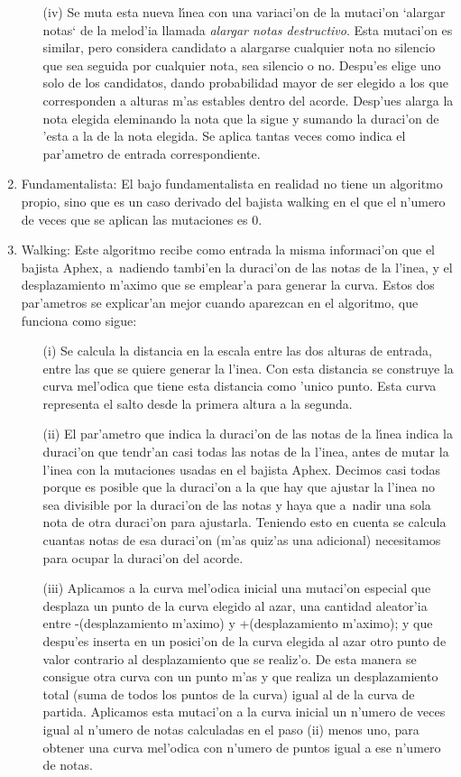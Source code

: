 \begin{enumerate}
\begin{enumerate}
		\item[(iv)] Se muta esta nueva l\'\i nea con una variaci'on de la mutaci'on `alargar notas` de la melod'ia llamada \emph{alargar notas destructivo}. Esta mutaci'on es similar, pero considera candidato a alargarse cualquier nota no silencio que sea seguida por cualquier nota, sea silencio o no. Despu'es elige uno solo de los candidatos, dando probabilidad mayor de ser elegido a los que corresponden a alturas m'as estables dentro del acorde. Desp'ues alarga la nota elegida eleminando la nota que la sigue y sumando la duraci'on de 'esta a la de la nota elegida. Se aplica tantas veces como indica el par'ametro de entrada correspondiente.
		\end{enumerate}
	\item Fundamentalista: El bajo fundamentalista en realidad no tiene un algoritmo propio, sino que es un caso derivado del bajista walking en el que el n'umero de veces que se aplican las mutaciones es 0.
	\item Walking: Este algoritmo recibe como entrada la misma informaci'on que el bajista Aphex, a~nadiendo tambi'en la duraci'on de las notas de la l'inea, y el desplazamiento m'aximo que se emplear'a para generar la curva. Estos dos par'ametros se explicar'an mejor cuando aparezcan en el algoritmo, que funciona como sigue:
		\begin{enumerate}
		\item[(i)] Se calcula la distancia en la escala entre las dos alturas de entrada, entre las que se quiere generar la l'inea. Con esta distancia se construye la curva mel'odica que tiene esta distancia como 'unico punto. Esta curva representa el salto desde la primera altura a la segunda. 
		\item[(ii)] El par'ametro que indica la duraci'on de las notas de la l\'\i nea indica la duraci'on que tendr'an casi todas las notas de la l'inea, antes de mutar la l'inea con la mutaciones usadas en el bajista Aphex. Decimos casi todas porque es posible que la duraci'on a la que hay que ajustar la l'inea no sea divisible por la duraci'on de las notas y haya que a~nadir una sola nota de otra duraci'on para ajustarla. Teniendo esto en cuenta se calcula cuantas notas de esa duraci'on (m'as quiz'as una adicional) necesitamos para ocupar la duraci'on del acorde.
		\item[(iii)] Aplicamos a la curva mel'odica inicial una mutaci'on especial que desplaza un punto de la curva elegido al azar, una cantidad aleator'ia entre -(desplazamiento m'aximo) y +(desplazamiento m'aximo); y que despu'es inserta en un posici'on de la curva elegida al azar otro punto de valor contrario al desplazamiento que se realiz'o. De esta manera se consigue otra curva con un punto m'as y que realiza un desplazamiento total (suma de todos los puntos de la curva) igual al de la curva de partida. Aplicamos esta mutaci'on a la curva inicial un n'umero de veces igual al n'umero de notas calculadas en el paso (ii) menos uno, para obtener una curva mel'odica con n'umero de puntos igual a ese n'umero de notas.

\end{enumerate}
\end{enumerate}

